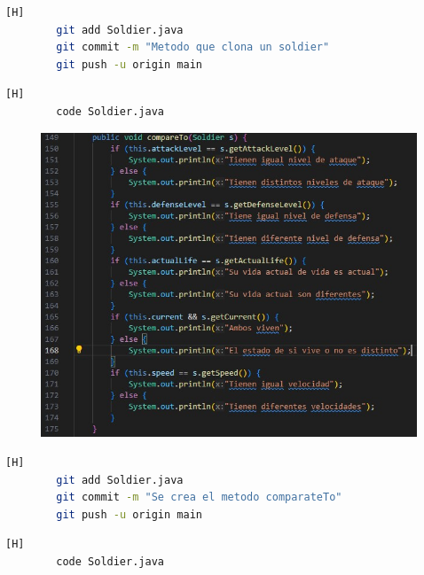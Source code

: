 \documentclass{article}
\begin{document}
	\begin{lstlisting}[language=bash,caption={Commit: 614e5b5aae38cf2232af5edb122c0db671195ef5}][H]
		git add Soldier.java
		git commit -m "Metodo que clona un soldier"			
		git push -u origin main
	\end{lstlisting}
	
	
	\begin{lstlisting}[language=bash,caption={El siguiente método comparará atributos }][H]
		code Soldier.java
	\end{lstlisting}
	
	\begin{figure}[H]
		\centering
		\includegraphics[width=1\textwidth,keepaspectratio]{img/compare.jpg}
	\end{figure}
	
		
	\begin{lstlisting}[language=bash,caption={Commit: c1eefb734f5354d04097855759507371f7c12d5c}][H]
		git add Soldier.java
		git commit -m "Se crea el metodo comparateTo"			
		git push -u origin main
	\end{lstlisting}
	
	
	
	\begin{lstlisting}[language=bash,caption={Se genera el soldado más poderoso}][H]
		code Soldier.java
	\end{lstlisting}
	
\end{document}
